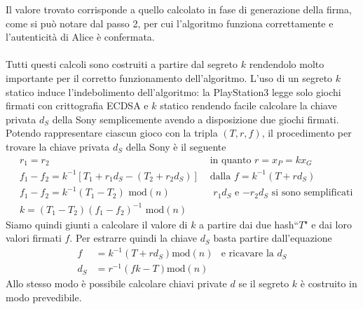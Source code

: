 \documentclass[a4paper,12pt]{tesiinfo}
\begin{document}
Il valore trovato corrisponde a quello calcolato in fase di generazione della firma, come si pu\`o notare dal passo 2, per cui l'algoritmo funziona correttamente e l'autenticit\`a di Alice \`e confermata.
\\
\\
Tutti questi calcoli sono costruiti a partire dal segreto $k$ rendendolo molto importante per il corretto funzionamento dell'algoritmo. L'uso di un segreto $k$ statico induce l'indebolimento dell'algoritmo: la PlayStation3 legge solo giochi firmati con crittografia ECDSA e $k$ statico rendendo facile calcolare la chiave privata $d_S$ della Sony semplicemente avendo a disposizione due giochi firmati. Potendo rappresentare ciascun gioco con la tripla $(T, r, f)$, il procedimento per trovare la chiave privata $d_S$ della Sony \`e il seguente
\begin{align*}
     &r_1 = r_2 &\text{ in quanto $r = x_P = kx_G$}\\
     &f_1 - f_2 = k^{-1} [T_1+r_1d_S - (T_2 + r_2d_S)] &\text{ dalla $f = k^{-1} (T+rd_S)$}\\
     &f_1 - f_2 = k^{-1} (T_1 - T_2)  \text{ mod$(n)$} &\text{ $r_1d_S$ e $-r_2d_S$ si sono semplificati}\\
     &k= (T_1 - T_2)(f_1 - f_2)^{-1} \text{ mod$(n)$}
\end{align*}
Siamo quindi giunti a calcolare il valore di $k$ a partire dai due hash``$T$" e dai loro valori firmati $f$. Per estrarre quindi la chiave $d_S$ basta partire dall'equazione
\begin{align*}
     f &= k^{-1}(T+rd_S) \text{mod}(n) &\text{e ricavare la } d_S\\
     d_S &= r^{-1}(fk-T) \text{mod}(n) 
\end{align*}
Allo stesso modo \`e possibile calcolare chiavi private $d$ se il segreto $k$ \`e costruito in modo prevedibile.
%
%
%
%
%
%
%
%
%
%
%
%
%
%
%
\end{document}
